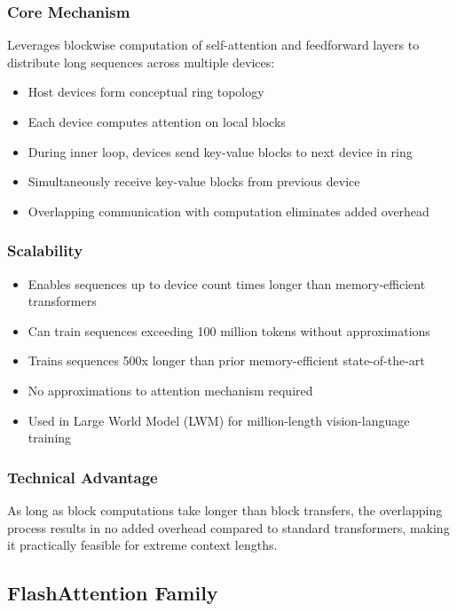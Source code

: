 \documentclass[11pt,letterpaper]{article}
\begin{document}
\subsubsection{Core Mechanism}
Leverages blockwise computation of self-attention and feedforward layers to distribute long sequences across multiple devices:
\begin{itemize}[leftmargin=*]
    \item Host devices form conceptual ring topology
    \item Each device computes attention on local blocks
    \item During inner loop, devices send key-value blocks to next device in ring
    \item Simultaneously receive key-value blocks from previous device
    \item Overlapping communication with computation eliminates added overhead
\end{itemize}

\subsubsection{Scalability}
\begin{itemize}[leftmargin=*]
    \item Enables sequences up to device count times longer than memory-efficient transformers
    \item Can train sequences exceeding 100 million tokens without approximations
    \item Trains sequences 500x longer than prior memory-efficient state-of-the-art
    \item No approximations to attention mechanism required
    \item Used in Large World Model (LWM) for million-length vision-language training
\end{itemize}

\subsubsection{Technical Advantage}
As long as block computations take longer than block transfers, the overlapping process results in no added overhead compared to standard transformers, making it practically feasible for extreme context lengths.

\subsection{FlashAttention Family}
\end{document}

